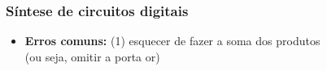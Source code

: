 \documentclass{beamer}
\begin{document}

\begin{frame}
\frametitle{Síntese de circuitos digitais}

\begin{itemize}
\item \textbf{Erros comuns: } (1) esquecer de fazer a soma dos produtos\\
(ou seja, omitir a porta or)
\end{itemize}

\begin{center}
%
%
\end{center}

\end{frame}

\end{document}

